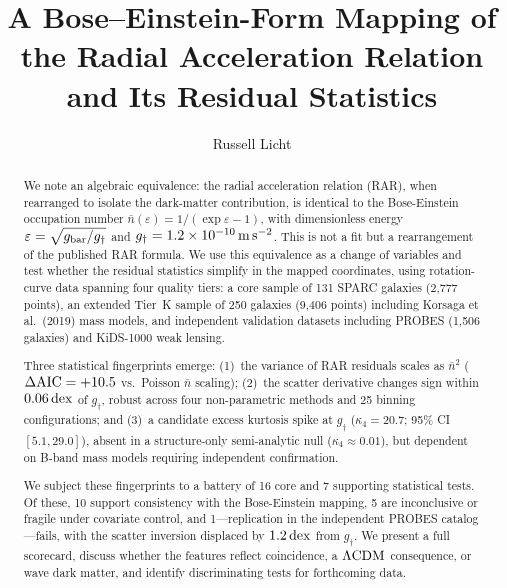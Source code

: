 \documentclass[twocolumn,twocolappendix]{aastex631}
\newcommand{\gbar}{g_{\rm bar}}
\newcommand{\gdag}{g_{\dagger}}
\newcommand{\nbar}{\bar{n}}
\newcommand{\dex}{\,{\rm dex}}
\newcommand{\lcdm}{\Lambda{\rm CDM}}
\newcommand{\daic}{\Delta{\rm AIC}}
\begin{document}
\title{A Bose--Einstein-Form Mapping of the Radial Acceleration Relation and Its Residual Statistics}

\author{Russell Licht}

\begin{abstract}
We note an algebraic equivalence: the radial acceleration relation (RAR),
when rearranged to isolate the dark-matter contribution, is identical to the
Bose-Einstein occupation number $\nbar(\varepsilon) = 1/(\exp\varepsilon - 1)$,
with dimensionless energy $\varepsilon = \sqrt{\gbar/\gdag}$ and
$\gdag = 1.2 \times 10^{-10}\,{\rm m\,s^{-2}}$.
This is not a fit but a rearrangement of the published RAR formula.
We use this equivalence as a change of variables and test whether the residual
statistics simplify in the mapped coordinates, using rotation-curve data
spanning four quality tiers: a core sample of 131 SPARC galaxies
(2{,}777 points), an extended Tier~K sample of 250 galaxies (9{,}406 points)
including Korsaga et al.\ (2019) mass models, and independent validation
datasets including PROBES (1{,}506 galaxies) and KiDS-1000 weak lensing.

Three statistical fingerprints emerge:
(1)~the variance of RAR residuals scales as $\nbar^2$
($\daic = +10.5$ vs.\ Poisson $\nbar$ scaling);
(2)~the scatter derivative changes sign within $0.06\dex$ of $\gdag$,
robust across four non-parametric methods and 25 binning configurations;
and (3)~a candidate excess kurtosis spike at $\gdag$
($\kappa_4 = 20.7$; 95\% CI $[5.1, 29.0]$), absent in a structure-only
semi-analytic null ($\kappa_4 \approx 0.01$), but dependent on B-band
mass models requiring independent confirmation.

We subject these fingerprints to a battery of 16 core and 7 supporting
statistical tests. Of these, 10 support consistency with the
Bose-Einstein mapping, 5 are inconclusive or fragile under covariate
control, and 1---replication in the independent PROBES catalog---fails,
with the scatter inversion displaced by $1.2\dex$ from $\gdag$.
We present a full scorecard, discuss whether the features reflect
coincidence, a $\lcdm$ consequence, or wave dark matter, and identify
discriminating tests for forthcoming data.
\end{abstract}


\end{document}
